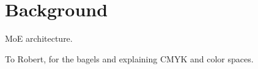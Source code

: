 \documentclass[acmsmall,screen,review,anonymous]{acmart}
\begin{document}

\section{Background}\label{sec:background}
MoE architecture.

\begin{acks}
To Robert, for the bagels and explaining CMYK and color spaces.
\end{acks}




\appendix
\end{document}
